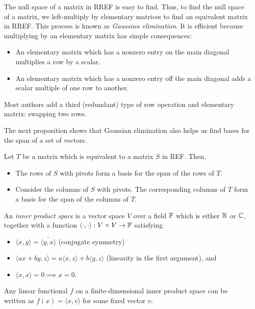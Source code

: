 \begin{rem}
  The null space of a matrix in RREF is easy to find.
  Thus, to find the null space of a matrix, we left-multiply by elementary
  matrices to find an equivalent matrix in RREF\@. This process is known as
  \emph{Gaussian elimination}. It is efficient because
  multiplying by an elementary matrix has simple consequences:
  \begin{itemize}
    \item An elementary matrix which has a nonzero entry on the main diagonal
      multiplies a row by a scalar.
    \item An elementary matrix which has a nonzero entry off the main diagonal
      adds a scalar multiple of one row to another. 
  \end{itemize}
  Most authors add a third (redundant) type of row operation and elementary
  matrix: swapping two rows.

  The next proposition shows that Gaussian elimination also helps us find bases
  for the span of a set of vectors.
\end{rem}
\begin{prop}
  Let $T$ be a matrix which is equivalent to a matrix $S$ in REF\@. Then,
  \begin{itemize}
    \item The rows of $S$ with pivots form a basis for the span of the rows of $T$.
    \item Consider the columns of $S$ with pivots. The corresponding columns of
      $T$ form a basis for the span of the columns of $T$.
  \end{itemize}
\end{prop}
\begin{defn}
  An \emph{inner product space} is a vector space $V$ over a field $\mathbb{F}$ which
  is either $\mathbb{R}$ or $\mathbb{C}$, together with a function
  $\langle\cdot,\cdot\rangle:V\times V\to\mathbb{F}$ satisfying
  \begin{itemize}
    \item $\langle  x, y\rangle=\overline{\langle 
      y, x\rangle}$ (conjugate
      symmetry)
    \item $\langle a x+b y, z\rangle=a\langle
      x, z\rangle+b\langle y, z\rangle$ (linearity in the
      first argument), and
    \item $\langle x, x\rangle=0\implies x= 0$.
  \end{itemize}
\end{defn}
\begin{prop}
  Any linear functional $f$ on a finite-dimensional inner product space can be
  written as $f(x)=\langle x,v\rangle$ for some fixed vector $v$.
\end{prop}
